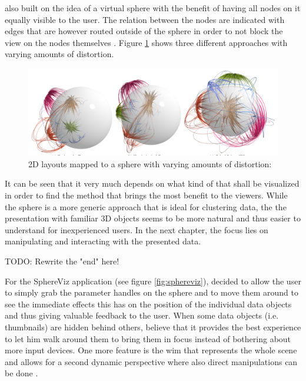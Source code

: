 \cite{Kwon2015} also built on the idea of a virtual sphere with the benefit of having all nodes on it equally visible to the user. The relation between the nodes are indicated with edges that are however routed outside of the sphere in order to not block the view on the nodes themselves \citep{Kwon2015}. Figure \ref{fig:sphericalgraph} shows three different approaches with varying amounts of distortion.
\begin{figure}[h]
	\begin{center}
		\includegraphics[width=14cm]{03_Figures/05_LitReview/Kwon2015_SphericalGraphLayout.png}
		\caption[2D layouts mapped to a sphere with varying amounts of distortion]{2D layouts mapped to a sphere with varying amounts of distortion:  \citep{Kwon2015}}
		\label{fig:sphericalgraph}
	\end{center}
\end{figure} \newline
It can be seen that it very much depends on what kind of that shall be visualized in order to find the method that brings the most benefit to the viewers. While the sphere is a more generic approach that is ideal for clustering data, the the presentation with familiar 3D objects seems to be more natural and thus easier to understand for inexperienced users. In the next chapter, the focus lies on manipulating and interacting with the presented data.

TODO: Rewrite the "end" here!

For the SphereViz application (see figure \ref{fig:sphereviz}), \cite{Soldati2007} decided to allow the user to simply grab the parameter handles on the sphere and to move them around to see the immediate effects this has on the position of the individual data objects and thus giving valuable feedback to the user. When some data objects (i.e. thumbnails) are hidden behind others, \cite{Soldati2007} believe that it provides the best experience to let him walk around them to bring them in focus instead of bothering about more input devices. One more feature is the \gls{wim} that represents the whole scene and allows for a second dynamic perspective where also direct manipulations can be done \citep{Soldati2007}.


